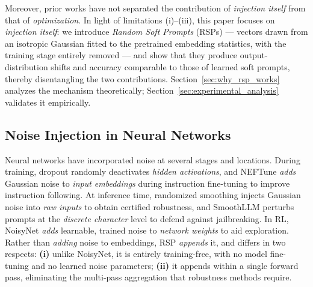 Moreover, prior works have not separated the contribution of \emph{injection itself} from that of \emph{optimization}. In light of limitations (i)--(iii), this paper focuses on \emph{injection itself}: we introduce \emph{Random Soft Prompts} (RSPs) --- vectors drawn from an isotropic Gaussian fitted to the pretrained embedding statistics, with the training stage entirely removed --- and show that they produce output-distribution shifts and accuracy comparable to those of learned soft prompts, thereby disentangling the two contributions. Section~\ref{sec:why_rsp_works} analyzes the mechanism theoretically; Section~\ref{sec:experimental_analysis} validates it empirically.

\subsection{Noise Injection in Neural Networks}\label{sec:rw_perturbation}

Neural networks have incorporated noise at several stages and locations. During training, dropout \citep{srivastava2014dropout} randomly deactivates \textit{hidden activations}, and NEFTune \citep{jain2024neftune} \textit{adds} Gaussian noise to \textit{input embeddings} during instruction fine-tuning to improve instruction following. At inference time, randomized smoothing \citep{cohen2019certified} injects Gaussian noise into \textit{raw inputs} to obtain certified robustness, and SmoothLLM \citep{robey2023smoothllm} perturbs prompts at the \textit{discrete character} level to defend against jailbreaking. In RL, NoisyNet \citep{fortunato2018noisy} \textit{adds} learnable, trained noise to \textit{network weights} to aid exploration. Rather than \textit{adding} noise to embeddings, RSP \textit{appends} it, and differs in two respects: \textbf{(i)} unlike NoisyNet, it is entirely training-free, with no model fine-tuning and no learned noise parameters; \textbf{(ii)} it appends within a single forward pass, eliminating the multi-pass aggregation that robustness methods require.
